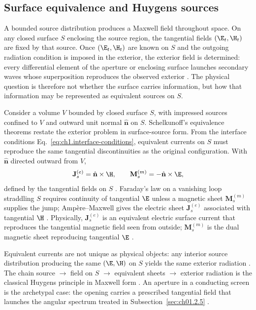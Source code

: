 \subsection{Surface equivalence and Huygens sources}
\label{sec:ch01.1.2b}

A bounded source distribution produces a Maxwell field throughout space. On any closed surface $S$ enclosing the source region, the tangential fields $(\E_t,\H_t)$ are fixed by that source. Once $(\E_t,\H_t)$ are known on $S$ and the outgoing radiation condition is imposed in the exterior, the exterior field is determined: every differential element of the aperture or enclosing surface launches secondary waves whose superposition reproduces the observed exterior \cite{stratton1941,silver1949}. The physical question is therefore not whether the surface carries information, but how that information may be represented as equivalent sources on $S$.

Consider a volume $V$ bounded by closed surface $S$, with impressed sources confined to $V$ and outward unit normal $\hat{\mathbf{n}}$ on $S$. Schelkunoff's equivalence theorems \cite{schelkunoff1943} restate the exterior problem in surface-source form. From the interface conditions Eq.~\eqref{eq:ch1.interface-conditions}, equivalent currents on $S$ must reproduce the same tangential discontinuities as the original configuration. With $\hat{\mathbf{n}}$ directed outward from $V$,
\begin{equation}
\label{eq:ch1.equivalent-surface-currents}
\mathbf{J}_s^{(e)}=\hat{\mathbf{n}}\times\H,
\qquad
\mathbf{M}_s^{(m)}=-\hat{\mathbf{n}}\times\E,
\end{equation}
defined by the tangential fields on $S$ \cite{stratton1941,harrington2001}. Faraday's law on a vanishing loop straddling $S$ requires continuity of tangential $\E$ unless a magnetic sheet $\mathbf{M}_s^{(m)}$ supplies the jump; Amp\`ere--Maxwell gives the electric sheet $\mathbf{J}_s^{(e)}$ associated with tangential $\H$ \cite{maxwell1873,jackson1999}. Physically, $\mathbf{J}_s^{(e)}$ is an equivalent electric surface current that reproduces the tangential magnetic field seen from outside; $\mathbf{M}_s^{(m)}$ is the dual magnetic sheet reproducing tangential $\E$ \cite{stratton1941}.

Equivalent currents are not unique as physical objects: any interior source distribution producing the same $(\E,\H)$ on $S$ yields the same exterior radiation \cite{stratton1941}. The chain source $\rightarrow$ field on $S$ $\rightarrow$ equivalent sheets $\rightarrow$ exterior radiation is the classical Huygens principle in Maxwell form \cite{silver1949,stratton1941}. An aperture in a conducting screen is the archetypal case: the opening carries a prescribed tangential field that launches the angular spectrum treated in Subsection~\ref{sec:ch01.2.5} \cite{stratton1941}.

